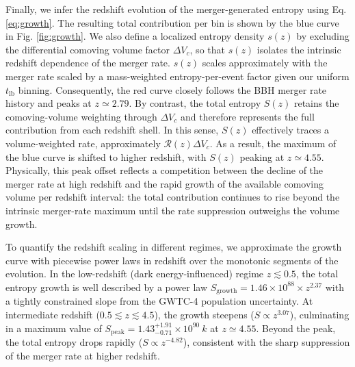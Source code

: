 \documentclass[twocolumn]{aastex631}
\begin{document}



Finally, we infer the redshift evolution of the merger-generated entropy using Eq. \ref{eq:growth}. The resulting total contribution per bin is shown by the blue curve in Fig. \ref{fig:growth}. We also define a localized entropy density $s(z)$ by excluding the differential comoving volume factor $\Delta V_c$, so that $s(z)$ isolates the intrinsic redshift dependence of the merger rate. $s(z)$ scales approximately with the merger rate scaled by a mass-weighted entropy-per-event factor given our uniform $t_\mathrm{lb}$ binning. Consequently, the red curve closely follows the BBH merger rate history and peaks at $z \simeq 2.79$. By contrast, the total entropy $S(z)$ retains the comoving-volume weighting through $\Delta V_c$ and therefore represents the full contribution from each redshift shell. In this sense, $S(z)$ effectively traces a volume-weighted rate, approximately $\mathcal{R}(z) \Delta V_c$. As a result, the maximum of the blue curve is shifted to higher redshift, with $S(z)$ peaking at $z\simeq 4.55$. Physically, this peak offset reflects a competition between the decline of the merger rate at high redshift and the rapid growth of the available comoving volume per redshift interval: the total contribution continues to rise beyond the intrinsic merger-rate maximum until the rate suppression outweighs the volume growth.

To quantify the redshift scaling in different regimes, we approximate the growth curve with piecewise power laws in redshift over the monotonic segments of the evolution. In the low-redshift (dark energy-influenced) regime $z \lesssim 0.5$, the total entropy growth is well described by a power law $S_\mathrm{growth} = 1.46 \times 10^{88} \times z^{2.37}$ with a tightly constrained slope from the GWTC-4 population uncertainty. At intermediate redshift ($0.5 \lesssim z \lesssim4.5$), the growth steepens ($S \propto z^{3.07}$), culminating in a maximum value of $S_\mathrm{peak} = 1.43^{+1.91}_{-0.71} \times 10^{90}~k$ at $z\simeq4.55$. Beyond the peak, the total entropy drops rapidly ($S \propto z^{-4.82}$), consistent with the sharp suppression of the merger rate at higher redshift.
\end{document}
